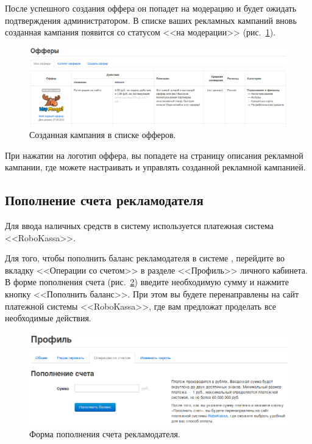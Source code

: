 \documentclass[a4paper,12pt]{article}
\begin{document}
После успешного создания оффера он попадет на модерацию и будет ожидать подтверждения администратором. В списке ваших рекламных кампаний вновь созданная кампания появится со статусом <<на модерации>> (рис.~\ref{fig:offer}).

\begin{figure}[!ht]
\centering
\includegraphics[width=\textwidth]{include/offer.png}
\caption{Созданная кампания в списке офферов.}
\label{fig:offer}
\end{figure}

При нажатии на логотип оффера, вы попадете на страницу описания рекламной кампании, где можете настраивать и управлять созданной рекламной кампанией.

\subsection{Пополнение счета рекламодателя}

Для ввода наличных средств в систему \heymoose{} используется платежная система <<RoboKassa>>.

Для того, чтобы пополнить баланс рекламодателя в системе \heymoose{}, перейдите во вкладку <<Операции со счетом>> в разделе <<Профиль>> личного кабинета. В форме пополнения счета (рис.~\ref{fig:operations}) введите необходимую сумму и нажмите кнопку <<Пополнить баланс>>. При этом вы будете перенаправлены на сайт платежной системы <<RoboKassa>>, где вам предложат проделать все необходимые действия.

\begin{figure}[!ht]
\centering
\includegraphics[width=\textwidth]{include/operations.png}
\caption{Форма пополнения счета рекламодателя.}
\label{fig:operations}
\end{figure}
\end{document}
